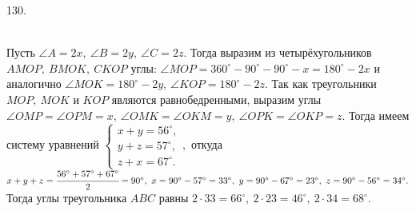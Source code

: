 130. \begin{figure}[ht!]
\end{figure}\\
Пусть $\angle A=2x,\ \angle B=2y,\ \angle C=2z.$ Тогда выразим из четырёхугольников $AMOP,\ BMOK,\ CKOP$ углы: $\angle MOP=360^\circ-90^\circ-90^\circ-x=180^\circ-2x$ и аналогично $\angle MOK=180^\circ-2y,\ \angle KOP=180^\circ-2z.$ Так как треугольники $MOP,\ MOK$ и $KOP$ являются равнобедренными, выразим углы $\angle OMP=\angle OPM=x,\ \angle OMK=\angle OKM=y,\ \angle OPK=\angle OKP=z.$ Тогда имеем систему уравнений $\begin{cases} x+y=56^\circ,\\ y+z=57^\circ,\\ z+x=67^\circ.\end{cases},$ откуда $x+y+z=\cfrac{56^\circ+57^\circ+67^\circ}{2}=90^\circ,\ x=90^\circ-57^\circ=33^\circ,\ y=90^\circ-67^\circ=23^\circ,\ z=90^\circ-56^\circ=34^\circ.$ Тогда углы треугольника $ABC$ равны $2\cdot33=66^\circ,\ 2\cdot23=46^\circ,\ 2\cdot34=68^\circ.$\\
